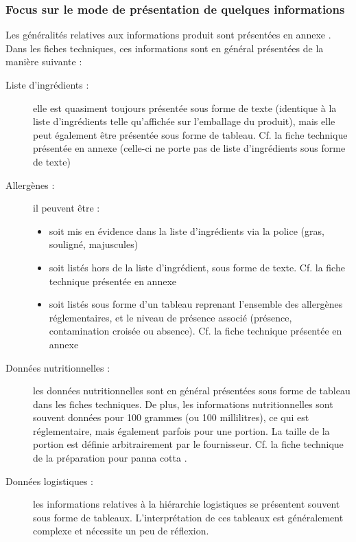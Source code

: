                 \subsubsection{Focus sur le mode de présentation de quelques informations}

            Les généralités relatives aux informations produit sont présentées en annexe .
            Dans les fiches techniques, ces informations sont en général présentées de la manière suivante :
            \begin{description}
                \item[Liste d'ingrédients : ] elle est quasiment toujours présentée sous forme de texte (identique à la liste d'ingrédients telle qu'affichée sur l'emballage du produit), mais elle peut également être présentée sous forme de tableau. Cf. la fiche technique présentée en annexe  (celle-ci ne porte pas de liste d'ingrédients sous forme de texte)
                \item[Allergènes : ] il peuvent être :
                \begin{itemize}
                    \item soit mis en évidence dans la liste d'ingrédients via la police (gras, souligné, majuscules)
                    \item soit listés hors de la liste d'ingrédient, sous forme de texte. Cf. la fiche technique présentée en annexe 
                    \item soit listés sous forme d'un tableau reprenant l'ensemble des allergènes réglementaires, et le niveau de présence associé (présence, contamination croisée ou absence). Cf. la fiche technique présentée en annexe 
                \end{itemize}
                \item[Données nutritionnelles : ] les données nutritionnelles sont en général présentées sous forme de tableau dans les fiches techniques. De plus, les informations nutritionnelles sont souvent données pour 100 grammes (ou 100 millilitres), ce qui est réglementaire, mais également parfois pour une portion. La taille de la portion est définie arbitrairement par le fournisseur.
                Cf. la fiche technique de la préparation pour panna cotta .
                \item[Données logistiques : ] les informations relatives à la hiérarchie logistiques se présentent souvent sous forme de tableaux.
                L'interprétation de ces tableaux est généralement complexe et nécessite un peu de réflexion.
            \end{description}
            
